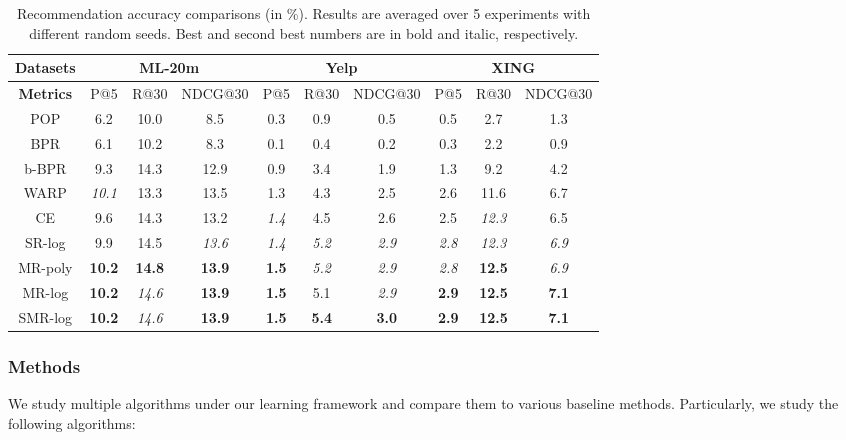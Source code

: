 \documentclass[letterpaper]{article} %
\makeatletter
\newcommand{\ndcg}{{\textsc{NDCG@30}}}
\newcommand{\pre}{{\textsc{P@5}}}
\newcommand{\rec}{{\textsc{R@30}}}
\newcommand{\pop}{\textsc{POP}}
\newcommand{\warp}{\textsc{non-a-WARP}}
\newcommand{\awarp}{\textsc{WARP}}
\newcommand{\bbpr}{b-BPR}
\newcommand{\bpr}{BPR}
\newcommand{\xing}{\textsf{XING}}
\newcommand{\yelp}{\textsf{Yelp}}
\newcommand{\movietwenty}{\textsf{ML-20m}}
\makeatother
\begin{document}
\begin{table}[!t]
\centering
\begin{tabular}{|c||c|c|c||c|c|c||  c| c| c|} \hline
\textbf{Datasets}  & \multicolumn{3}{c||}{\movietwenty} & \multicolumn{3}{|c||}{\yelp}  & \multicolumn{3}{|c|}{\xing} \\ \hline
\textbf{Metrics}  & \pre  & \rec  & \ndcg  & \pre  & \rec    & \ndcg  & \pre  & \rec  & \ndcg  \\ \hline
 \pop         &6.2&10.0&8.5  &0.3&0.9&0.5    &0.5&2.7&1.3  \\ \hline
\bpr          &6.1 &10.2 & 8.3 &0.1 & 0.4&0.2 &0.3 &2.2 &0.9 \\ \hline
\bbpr     &9.3 &14.3 &12.9  &0.9&3.4&1.9 &1.3& 9.2 & 4.2  \\ \hline%
\awarp      &\textit{10.1}&13.3&13.5 &1.3&4.3&2.5     &2.6&11.6 &6.7\\ \hline
CE      &9.6&14.3&13.2  &\textit{1.4}&4.5&2.6  &2.5& \textit{12.3} & 6.5 \\ \hline\hline%
SR-log        &9.9 & 14.5  &\textit{13.6}  &\textit{1.4} & \textit{5.2} &\textit{2.9}  &\textit{2.8}  &\textit{12.3}  &\textit{6.9} \\ \hline%
MR-poly      &\textbf{10.2} &\textbf{14.8} &\textbf{13.9}    &\textbf{1.5} &\textit{5.2} & \textit{2.9}  &\textit{2.8}  &\textbf{12.5}  &\textit{6.9}\\ \hline%
MR-log        &\textbf{10.2}&\textit{14.6}&\textbf{13.9}  &\textbf{1.5}& 5.1& \textit{2.9}   &\textbf{2.9}& \textbf{12.5}&\textbf{7.1}\\ \hline
SMR-log      &\textbf{10.2} &\textit{14.6} &\textbf{13.9}   &\textbf{1.5}& \textbf{5.4}& \textbf{3.0}  &\textbf{2.9}& \textbf{12.5} & \textbf{7.1} \\ \hline%
\end{tabular}
\caption{Recommendation accuracy comparisons (in \%). Results are averaged over 5 experiments with different random seeds. Best and second best numbers are in bold and italic, respectively.}
\label{t:accuracy}
\end{table}

\subsubsection{Methods}
We study multiple algorithms under our learning framework and compare them to various baseline methods. Particularly, we study the following algorithms:
\end{document}
